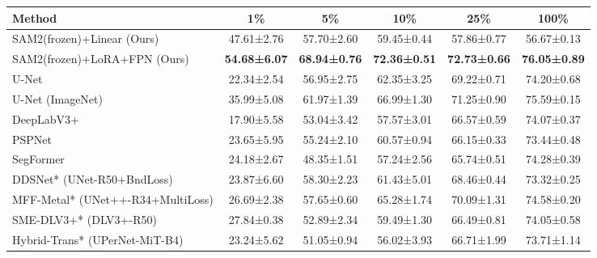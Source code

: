 \begin{tabular}{lccccc}
\toprule
Method & 1\% & 5\% & 10\% & 25\% & 100\% \\
\midrule
SAM2(frozen)+Linear (Ours) & 47.61±2.76 & 57.70±2.60 & 59.45±0.44 & 57.86±0.77 & 56.67±0.13 \\
SAM2(frozen)+LoRA+FPN (Ours) & \textbf{54.68±6.07} & \textbf{68.94±0.76} & \textbf{72.36±0.51} & \textbf{72.73±0.66} & \textbf{76.05±0.89} \\
\midrule
U-Net & 22.34±2.54 & 56.95±2.75 & 62.35±3.25 & 69.22±0.71 & 74.20±0.68 \\
U-Net (ImageNet) & 35.99±5.08 & 61.97±1.39 & 66.99±1.30 & 71.25±0.90 & 75.59±0.15 \\
DeepLabV3+ & 17.90±5.58 & 53.04±3.42 & 57.57±3.01 & 66.57±0.59 & 74.07±0.37 \\
PSPNet & 23.65±5.95 & 55.24±2.10 & 60.57±0.94 & 66.15±0.33 & 73.44±0.48 \\
SegFormer & 24.18±2.67 & 48.35±1.51 & 57.24±2.56 & 65.74±0.51 & 74.28±0.39 \\
\midrule
DDSNet* (UNet-R50+BndLoss) & 23.87±6.60 & 58.30±2.23 & 61.43±5.01 & 68.46±0.44 & 73.32±0.25 \\
MFF-Metal* (UNet++-R34+MultiLoss) & 26.69±2.38 & 57.65±0.60 & 65.28±1.74 & 70.09±1.31 & 74.58±0.20 \\
SME-DLV3+* (DLV3+-R50) & 27.84±0.38 & 52.89±2.34 & 59.49±1.30 & 66.49±0.81 & 74.05±0.58 \\
Hybrid-Trans* (UPerNet-MiT-B4) & 23.24±5.62 & 51.05±0.94 & 56.02±3.93 & 66.71±1.99 & 73.71±1.14 \\
\bottomrule
\end{tabular}
